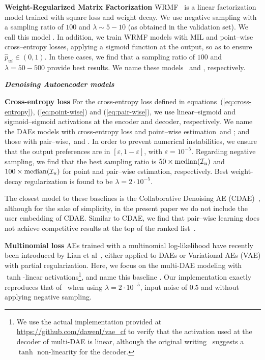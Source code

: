 \textbf{Weight-Regularized Matrix Factorization} WRMF~\cite{HuKoren:2008:CF_implicit} is a linear factorization model  trained with square loss and weight decay. We use negative sampling with a sampling ratio of $100$ and $\lambda\sim 5-10$ (as obtained in the validation set). We call this model \MFsquare. In addition, we train WRMF models with MIL and point--wise cross--entropy losses, applying a sigmoid function at the output, so as to ensure $\hat{p}_{ui}\in(0,1)$. In these cases, we find that a sampling ratio of $100$ and $\lambda=50-500$ provide best results. We name these models \MFmil\, and \MFce, respectively.

\textbf{\emph{Denoising Autoencoder models}}

\textbf{Cross-entropy loss} For the cross-entropy loss defined in equations~(\ref{eq:cross-entropy}), (\ref{eq:point-wise}) and (\ref{eq:pair-wise}), we use linear--sigmoid and sigmoid--sigmoid activations at the encoder and decoder, respectively. We name the DAEs models with cross-entropy loss and point--wise estimation \CEpointlinsig\,and \CEpointsigsig; and those with pair--wise,  \CEpairlinsig \,and \CEpairsigsig. In order to prevent numerical instabilities, we ensure that the output preferences are in $[\varepsilon, 1-\varepsilon]$, with $\varepsilon=10^{-5}$. Regarding negative sampling, we find that the best sampling ratio is $50\times {\rm median}(\mathcal{I}_u)$ and $100\times {\rm median}(\mathcal{I}_u)$  for point and pair--wise estimation, respectively. Best weight-decay regularization is found to be $\lambda=2\cdot 10^{-5}$.

The closest model to these baselines is the Collaborative Denoising AE (CDAE)~\cite{Wu:2016:CDAE-topN}, although for the sake of simplicity, in the present paper we do not include the user embedding of CDAE. 
Similar to CDAE, we find that  pair--wise learning does not achieve competitive results at the top of the ranked list~\cite{Wu:2016:CDAE-topN, liang:2018:VAE}. 

\textbf{Multinomial loss} AEs trained with a multinomial log-likelihood have recently been  introduced by Lian et al~\cite{liang:2018:VAE}, either applied to DAEs or Variational AEs (VAE) with partial regularization. Here, we focus on the multi-DAE modeling with $\tanh$-linear activations\footnote{
We use the actual implementation provided at \url{https://github.com/dawenl/vae_cf} to verify that the activation used at the decoder of multi-DAE is linear, although the original writing~\cite{liang:2018:VAE} suggests a $\tanh$ non-linearity for the decoder.
}, and name this baseline \MULTItanhlin. Our implementation exactly reproduces that of~\cite{liang:2018:VAE} when using $\lambda=2\cdot 10^{-5}$, input noise of $0.5$ and without applying negative sampling. 

